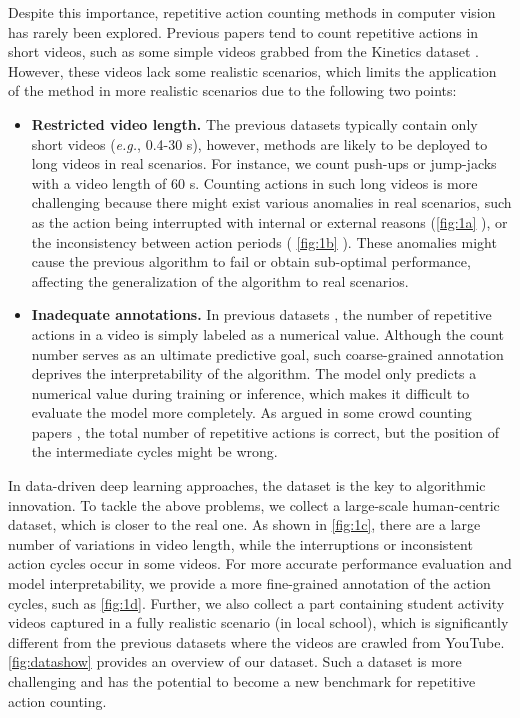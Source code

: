 \documentclass[10pt,twocolumn,letterpaper]{article}
\begin{document}
Despite this importance, repetitive action counting methods in computer vision has rarely been explored. Previous papers \cite{Zhang_2020_CVPR,RepNet} tend to count repetitive actions in short videos, such as some simple videos grabbed from the Kinetics dataset \cite{kay2017kinetics}. However, these videos lack some realistic scenarios, which limits the application of the method in more realistic scenarios due to the following two points:

\begin{itemize}
\item \textbf{Restricted video length.} The previous datasets \cite{Runia_2018_CVPR,Zhang_2020_CVPR,RepNet,synthesized} typically contain only short videos (\emph{e.g.}, 0.4-30 s), however, methods are likely to be deployed to long videos in real scenarios. For instance, we count push-ups or jump-jacks with a video length of 60 s. Counting actions in such long videos is more challenging because there might exist various anomalies in real scenarios, such as the action being interrupted with internal or external reasons (\cref{fig:1a} ), or the inconsistency between action periods ( \cref{fig:1b} ). These anomalies might cause the previous algorithm to fail or obtain sub-optimal performance, affecting the generalization of the algorithm to real scenarios.

\item \textbf{Inadequate annotations.} In previous datasets \cite{Runia_2018_CVPR,Zhang_2020_CVPR,RepNet,synthesized}, the number of repetitive actions in a video is simply labeled as a numerical value. Although the count number serves as an ultimate predictive goal, such coarse-grained annotation deprives the interpretability of the algorithm. The model only predicts a numerical value during training or inference, which makes it difficult to evaluate the model more completely. As argued in some crowd counting papers \cite{MCNN,Wan_2019_ICCV,Ranjan_2018_ECCV,liu2019context}, the total number of repetitive actions is correct, but the position of the intermediate cycles might be wrong. 



\end{itemize}

In data-driven deep learning approaches, the dataset is the key to algorithmic innovation. To tackle the above problems, we collect a large-scale human-centric dataset, which is closer to the real one. As shown in \cref{fig:1c}, there are a large number of variations in video length, while the interruptions or inconsistent action cycles occur in some videos. For more accurate performance evaluation and model interpretability, we provide a more fine-grained annotation of the action cycles, such as \cref{fig:1d}. Further, we also collect a part containing student activity videos captured in a fully realistic scenario (in local school), which is significantly different from the previous datasets where the videos are crawled from YouTube. \cref{fig:datashow} provides an overview of our dataset. Such a dataset is more challenging and has the potential to become a new benchmark for repetitive action counting.
\end{document}
